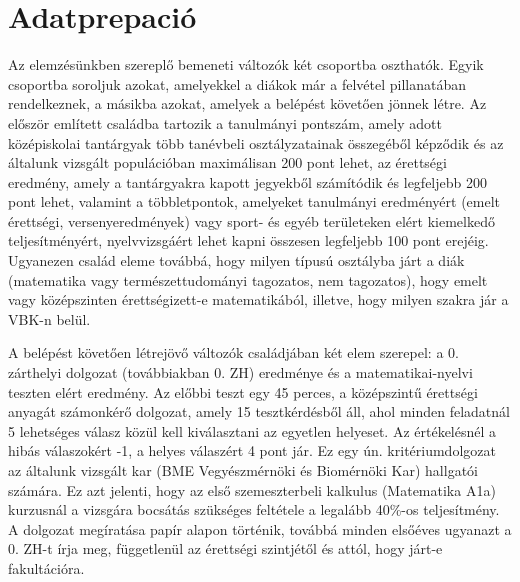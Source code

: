\documentclass[12pt]{article}
\begin{document}

\newpage

\section{Adatprepació}

Az elemzésünkben szereplő bemeneti változók két csoportba oszthatók. Egyik csoportba soroljuk azokat, amelyekkel a diákok már a felvétel pillanatában rendelkeznek, a másikba azokat, amelyek a belépést követően jönnek létre. Az először említett családba tartozik a tanulmányi pontszám, amely adott középiskolai tantárgyak több tanévbeli osztályzatainak összegéből képződik és az általunk vizsgált populációban maximálisan 200 pont lehet, az érettségi eredmény, amely a tantárgyakra kapott jegyekből számítódik és legfeljebb 200 pont lehet, valamint a többletpontok, amelyeket tanulmányi eredményért (emelt érettségi, versenyeredmények) vagy sport- és egyéb területeken elért kiemelkedő teljesítményért, nyelvvizsgáért lehet kapni összesen legfeljebb 100 pont erejéig. Ugyanezen család eleme továbbá, hogy milyen típusú osztályba járt a diák (matematika vagy természettudományi tagozatos, nem tagozatos), hogy emelt vagy középszinten érettségizett-e matematikából, illetve, hogy milyen szakra jár a VBK-n belül.

A belépést követően létrejövő változók családjában két elem szerepel: a 0. zárthelyi dolgozat (továbbiakban 0. ZH) eredménye és a matematikai-nyelvi teszten elért eredmény. Az előbbi teszt egy 45 perces, a középszintű érettségi anyagát számonkérő dolgozat, amely 15 tesztkérdésből áll, ahol minden feladatnál 5 lehetséges válasz közül kell kiválasztani az egyetlen helyeset. Az értékelésnél a hibás válaszokért -1, a helyes válaszért 4 pont jár. Ez egy ún. kritériumdolgozat az általunk vizsgált kar (BME Vegyészmérnöki és Biomérnöki Kar) hallgatói számára. Ez azt jelenti, hogy az első szemeszterbeli kalkulus (Matematika A1a) kurzusnál a vizsgára bocsátás szükséges feltétele a legalább 40\%-os teljesítmény. A dolgozat megíratása papír alapon történik, továbbá minden elsőéves ugyanazt a 0. ZH-t írja meg, függetlenül az érettségi szintjétől és attól, hogy járt-e fakultációra.
\end{document}

